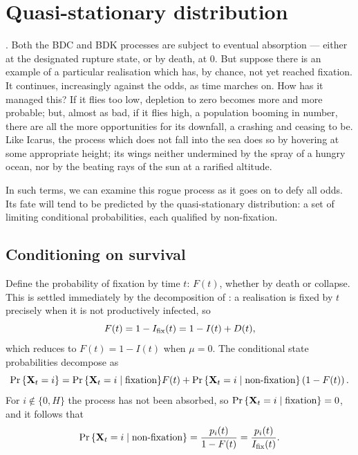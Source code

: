 \section{Quasi-stationary distribution}
\label{sec:qsd}

\cite{van2011quasi}. Both the BDC and BDK processes are subject to eventual
absorption --- either at the designated rupture state, or by death, at $0$.
But suppose there is an example of a particular realisation which has, by
chance, not yet reached fixation. It continues, increasingly against the
odds, as time marches on. How has it managed this? If it flies too low,
depletion to zero becomes more and more probable; but, almost as bad, if it
flies high, a population booming in number, there are all the more
opportunities for its downfall, a crashing and ceasing to be.
Like Icarus, the process which does not fall into the sea does so by
hovering at some appropriate height; its wings neither undermined by the
spray of a hungry ocean, nor by the beating rays of the sun at a rarified
altitude. \par
In such terms, we can examine this rogue process as it goes on to defy all
odds. Its fate will tend to be predicted by the quasi-stationary
distribution: a set of limiting conditional probabilities, each qualified by
non-fixation. \par

\subsection{Conditioning on survival}

Define the probability of fixation by time $t$: $F(t)$, whether by death or
collapse. This is settled immediately by the decomposition of : a
realisation is fixed by $t$ precisely when it is not productively infected,
so
\begin{equation}
F(t)=1-I_{\mathrm{fix}}(t)=1-I(t)+D(t),
\end{equation}
which reduces to $F(t)=1-I(t)$ when $\mu=0$. The conditional state
probabilities decompose as
$${\text{Pr}\left\{{{\bf X}_t} = i\right\}} = {\text{Pr}\left\{{{\bf X}_t}=i\mid \text{fixation}\right\}}F(t) + {\text{Pr}\left\{{{\bf X}_t}=i\mid \text{non-fixation}\right\}} \left(1-F(t)\right).$$
For $i\notin\{0,H\}$ the process has not been absorbed, so
${\text{Pr}\left\{{{\bf X}_t}=i\mid\text{fixation}\right\}}=0$, and it follows that
\begin{equation}
{\text{Pr}\left\{{{\bf X}_t}=i\mid \text{non-fixation}\right\}} = \frac{p_i(t)}{1-F(t)}=\frac{p_i(t)}{I_{\mathrm{fix}}(t)}.
\label{eq:condp}
\end{equation}

